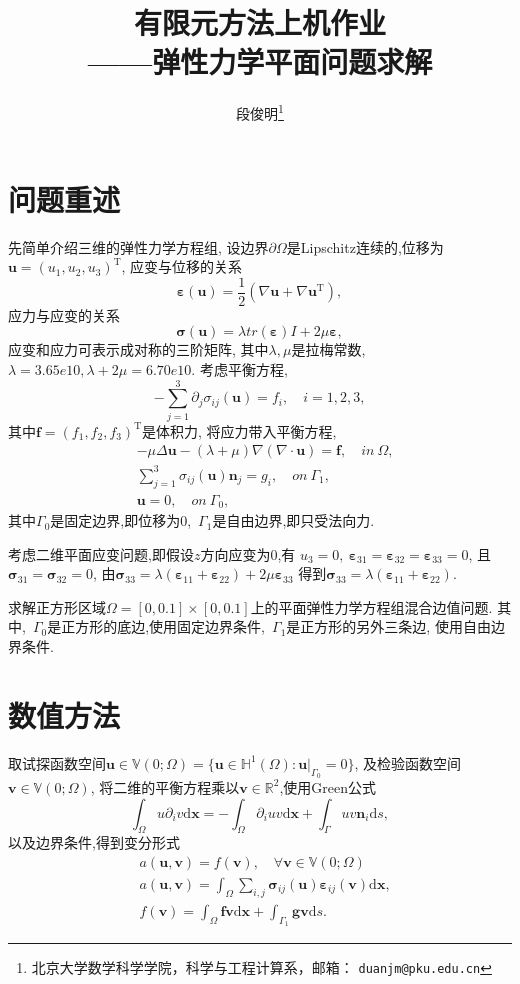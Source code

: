 \documentclass[a4paper, 11pt]{ctexart}
\title{有限元方法上机作业\\ ——弹性力学平面问题求解}
\newcommand\bu{\boldsymbol{u}}
\newcommand\bv{\boldsymbol{v}}
\newcommand\bx{\boldsymbol{x}}
\newcommand\bn{\boldsymbol{n}}
\newcommand\bg{\boldsymbol{g}}
\newcommand\dd{\mathrm{d}}
\newcommand\bbR{\mathbb{R}}
\newcommand\bbV{\mathbb{V}}
\newcommand\bbH{\mathbb{H}}
\newcommand\beps{\bm{\varepsilon}}
\newcommand\bsig{\bm{\sigma}}
\newcommand\trace[1]{tr(#1)}
\begin{document}
\author{段俊明\thanks{北京大学数学科学学院，科学与工程计算系，邮箱： {\tt duanjm@pku.edu.cn}}
}
\maketitle

\section{问题重述}
先简单介绍三维的弹性力学方程组,
设边界$\partial\Omega$是Lipschitz连续的,位移为$\bu=(u_1,u_2,u_3)^\mathrm{T}$,
应变与位移的关系
\begin{equation}
  \beps(\bu)=\frac12(\nabla\bu+\nabla\bu^{\mathrm{T}}),
\end{equation}
应力与应变的关系
\begin{equation}
  \bsig(\bu)=\lambda\trace{\beps}I+2\mu\beps,
\end{equation}
应变和应力可表示成对称的三阶矩阵,
其中$\lambda,\mu$是拉梅常数,~$\lambda=3.65e10,\lambda+2\mu=6.70e10$.
考虑平衡方程,
\begin{equation}
  -\sum\limits_{j=1}^3 \partial_j\sigma_{ij}(\bu)=f_i,\quad i=1,2,3,
  \label{eq:balance}
\end{equation}
其中$\boldsymbol{f}=(f_1,f_2,f_3)^\mathrm{T}$是体积力,
将应力带入平衡方程,
\begin{align}
  &-\mu\Delta\bu-(\lambda+\mu)\nabla(\nabla\cdot\bu)=\boldsymbol{f},\quad in~\Omega,\\
  &\sum\limits_{j=1}^3 \sigma_{ij}(\bu)\bn_j=g_i,\quad on~\Gamma_1,\\
  &\bu=0,\quad on~\Gamma_0,
\end{align}
其中$\Gamma_0$是固定边界,即位移为0,~$\Gamma_1$是自由边界,即只受法向力.

考虑二维平面应变问题,即假设$z$方向应变为0,有
$u_3=0,~\beps_{31}=\beps_{32}=\beps_{33} =0$,
且$\bsig_{31}=\bsig_{32}=0$,
由$\bsig_{33}=\lambda(\beps_{11}+\beps_{22})+2\mu\beps_{33}$
得到$\bsig_{33}=\lambda(\beps_{11}+\beps_{22})$.

求解正方形区域$\Omega=[0,0.1]\times[0,0.1]$上的平面弹性力学方程组混合边值问题.
其中,~$\Gamma_0$是正方形的底边,使用固定边界条件,~$\Gamma_1$是正方形的另外三条边,
使用自由边界条件.

\section{数值方法}
取试探函数空间$\bu\in\bbV(0;\Omega)=\{\bu\in\bbH^1(\Omega):\bu|_{\Gamma_0}=0\}$,
及检验函数空间$\bv\in\bbV(0;\Omega)$,
将二维的平衡方程乘以$\bv\in{\bbR^2}$,使用Green公式
\begin{equation}
  \int_{\Omega}u\partial_i v\dd \bx=-\int_{\Omega}\partial_i uv\dd
  \bx+\int_{\Gamma}uv\bn_i\dd s,
\end{equation}
以及边界条件,得到变分形式
\begin{align}
  &a(\bu,\bv) = f(\bv),\quad\forall \bv\in\bbV(0;\Omega)\\
  &a(\bu,\bv) = \int_\Omega \sum_{i,j}\bsig_{ij}(\bu)\beps_{ij}(\bv)\dd\bx, \\
  &f(\bv) = \int_\Omega \boldsymbol{f}\bv\dd \bx + \int_{\Gamma_1}\bg\bv\dd s.
\end{align}
\end{document}
